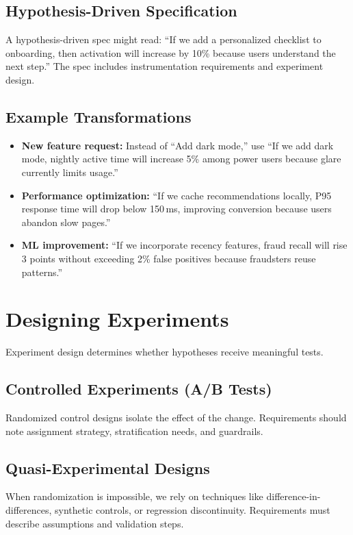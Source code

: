 \subsection{Hypothesis-Driven Specification}
A hypothesis-driven spec might read: ``If we add a personalized checklist to onboarding, then activation will increase by 10\% because users understand the next step.'' The spec includes instrumentation requirements and experiment design.

\subsection{Example Transformations}
\begin{itemize}
    \item \textbf{New feature request:} Instead of ``Add dark mode,'' use ``If we add dark mode, nightly active time will increase 5\% among power users because glare currently limits usage.''
    \item \textbf{Performance optimization:} ``If we cache recommendations locally, P95 response time will drop below 150\,ms, improving conversion because users abandon slow pages.''
    \item \textbf{ML improvement:} ``If we incorporate recency features, fraud recall will rise 3 points without exceeding 2\% false positives because fraudsters reuse patterns.''
\end{itemize}

\section{Designing Experiments}
\label{sec:experiment-design}

Experiment design determines whether hypotheses receive meaningful tests.

\subsection{Controlled Experiments (A/B Tests)}
Randomized control designs isolate the effect of the change. Requirements should note assignment strategy, stratification needs, and guardrails.

\subsection{Quasi-Experimental Designs}
When randomization is impossible, we rely on techniques like difference-in-differences, synthetic controls, or regression discontinuity. Requirements must describe assumptions and validation steps.

